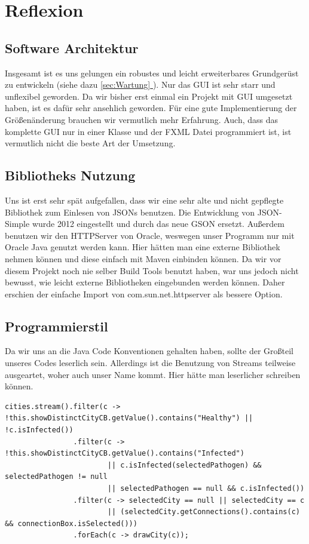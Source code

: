 \documentclass{article}
\newcommand{\fullref}[1]{\hyperref[{#1}]{\ref{#1} \nameref{#1}}} %
\newcommand{\gquote}[1]{\glqq #1\grqq} %
\begin{document}
\section{Reflexion}
\subsection{Software Architektur}
Insgesamt ist es uns gelungen ein robustes und leicht erweiterbares Grundgerüst zu entwickeln (siehe dazu \fullref{sec:Wartung}). Nur das GUI ist sehr starr und unflexibel geworden. Da wir bisher erst einmal ein Projekt mit GUI umgesetzt haben, ist es dafür sehr ansehlich geworden. Für eine gute Implementierung der Größenänderung brauchen wir vermutlich mehr Erfahrung. Auch, dass das komplette GUI nur in einer Klasse und der FXML Datei programmiert ist, ist vermutlich nicht die beste Art der Umsetzung.
\subsection{Bibliotheks Nutzung}
Uns ist erst sehr spät aufgefallen, dass wir eine sehr alte und nicht gepflegte Bibliothek zum Einlesen von JSONs benutzen. Die Entwicklung von JSON-Simple wurde 2012 eingestellt und durch das neue GSON ersetzt. Außerdem benutzen wir den HTTPServer von Oracle, weswegen unser Programm nur mit Oracle Java genutzt werden kann. Hier hätten man eine externe Bibliothek nehmen können und diese einfach mit Maven einbinden können. Da wir vor diesem Projekt noch nie selber Build Tools benutzt haben, war uns jedoch nicht bewusst, wie leicht externe Bibliotheken eingebunden werden können. Daher erschien der einfache Import von \gquote{com.sun.net.httpserver} als bessere Option.
\subsection{Programmierstil}
Da wir uns an die Java Code Konventionen gehalten haben, sollte der Großteil unseres Codes leserlich sein. Allerdings ist die Benutzung von Streams teilweise ausgeartet, woher auch unser Name kommt. Hier hätte man leserlicher schreiben können.
\begin{lstlisting}[title={Beispiel für einen zu komplexen Stream}]
cities.stream().filter(c -> !this.showDistinctCityCB.getValue().contains("Healthy") || !c.isInfected())
				.filter(c -> !this.showDistinctCityCB.getValue().contains("Infected")
						|| c.isInfected(selectedPathogen) && selectedPathogen != null
						|| selectedPathogen == null && c.isInfected())
				.filter(c -> selectedCity == null || selectedCity == c
						|| (selectedCity.getConnections().contains(c) && connectionBox.isSelected()))
				.forEach(c -> drawCity(c));
\end{lstlisting}
\end{document}
